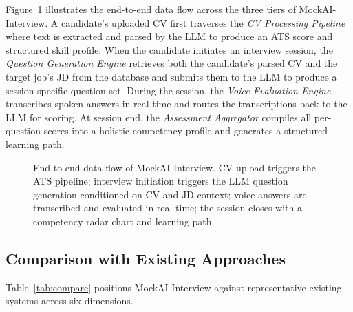 \documentclass[pdflatex,sn-mathphys-num]{sn-jnl}%
\theoremstyle{thmstyleone}%
\theoremstyle{thmstyletwo}%
\theoremstyle{thmstylethree}%
\begin{document}
Figure~\ref{fig:overview} illustrates the end-to-end data flow across the three tiers of MockAI-Interview. A candidate's uploaded CV first traverses the \textit{CV Processing Pipeline} where text is extracted and parsed by the LLM to produce an ATS score and structured skill profile. When the candidate initiates an interview session, the \textit{Question Generation Engine} retrieves both the candidate's parsed CV and the target job's JD from the database and submits them to the LLM to produce a session-specific question set. During the session, the \textit{Voice Evaluation Engine} transcribes spoken answers in real time and routes the transcriptions back to the LLM for scoring. At session end, the \textit{Assessment Aggregator} compiles all per-question scores into a holistic competency profile and generates a structured learning path.

\begin{figure}[h]
\centering
\caption{End-to-end data flow of MockAI-Interview. CV upload triggers the ATS pipeline; interview initiation triggers the LLM question generation conditioned on CV and JD context; voice answers are transcribed and evaluated in real time; the session closes with a competency radar chart and learning path.}\label{fig:overview}
\end{figure}

\subsection{Comparison with Existing Approaches}\label{subsec3-compare}

Table~\ref{tab:compare} positions MockAI-Interview against representative existing systems across six dimensions.
\end{document}
